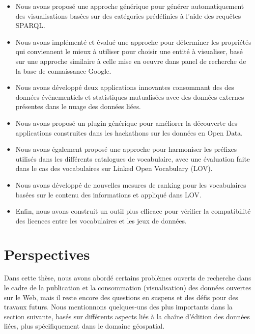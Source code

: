 \documentclass[a4paper,11pt,twoside]{report}
\begin{document}
\begin{itemize}
\item 

Nous avons proposé une approche générique pour générer automatiquement des visualisations basées sur des catégories prédéfinies à l'aide des requêtes SPARQL.

\item 

Nous avons implémenté et évalué une approche pour déterminer les propriétés qui conviennent le mieux à utiliser pour choisir une entité à visualiser, basé sur une approche similaire à celle mise en oeuvre dans panel de recherche de la base de connaissance Google.


\item 
Nous avons développé deux applications innovantes consommant des des données événementiels et statistiques mutualisées avec des données externes présentes dans le nuage des données liées. 

\item 
Nous avons proposé un plugin générique pour améliorer la découverte des applications construites dans les hackathons sur les données en Open Data.

\item 
Nous avons également proposé une approche pour harmoniser les préfixes utilisés dans les différents catalogues de vocabulaire, avec une évaluation faite dans le cas des vocabulaires  sur Linked Open Vocabulary (LOV).

\item 
Nous avons développé de nouvelles mesures de ranking pour les vocabulaires basées sur le contenu des informations et appliqué dans LOV.

\item 
Enfin, nous avons construit un outil plus efficace pour vérifier la compatibilité des licences entre les vocabulaires et les jeux de données.

\end{itemize}


\section*{Perspectives}
\label{sec:future}
 

Dans cette thèse, nous avons abordé certains problèmes ouverts de recherche dans le cadre de la publication et la consommation (visualisation) des données ouvertes sur le Web, mais il reste encore des questions en suspens et des défis pour des travaux futurs. Nous mentionnons quelques-uns des plus importants dans la section suivante, basés sur différents aspects liés à la chaîne d'édition des données liées, plus spécifiquement dans le domaine géospatial.
\end{document}
